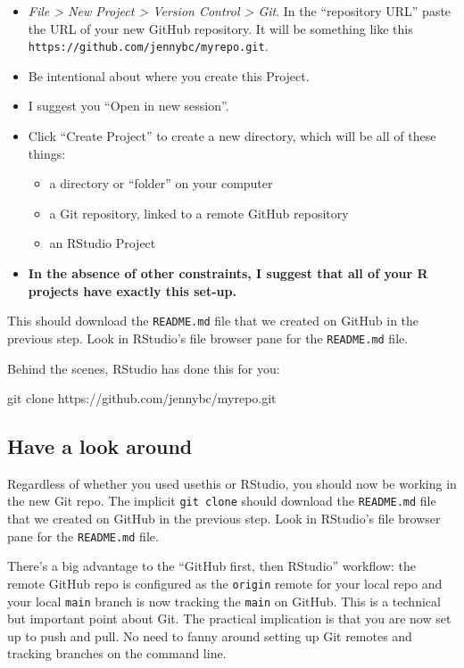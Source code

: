\documentclass[
]{book}
\newenvironment{Shaded}{\begin{snugshade}}{\end{snugshade}}
\newcommand{\NormalTok}[1]{#1}
\providecommand{\tightlist}{%
  \setlength{\itemsep}{0pt}\setlength{\parskip}{0pt}}
\begin{document}
\begin{itemize}
\tightlist
\item
  \emph{File \textgreater{} New Project \textgreater{} Version Control \textgreater{} Git}. In the ``repository URL'' paste
  the URL of your new GitHub repository. It will be something like this
  \texttt{https://github.com/jennybc/myrepo.git}.
\item
  Be intentional about where you create this Project.
\item
  I suggest you ``Open in new session''.
\item
  Click ``Create Project'' to create a new directory, which will be all of these things:

  \begin{itemize}
  \tightlist
  \item
    a directory or ``folder'' on your computer
  \item
    a Git repository, linked to a remote GitHub repository
  \item
    an RStudio Project
  \end{itemize}
\item
  \textbf{In the absence of other constraints, I suggest that all of your R projects have exactly this set-up.}
\end{itemize}

This should download the \texttt{README.md} file that we created on GitHub in the previous step.
Look in RStudio's file browser pane for the \texttt{README.md} file.

Behind the scenes, RStudio has done this for you:

\begin{Shaded}
\begin{Highlighting}[]
\NormalTok{git clone https://github.com/jennybc/myrepo.git}
\end{Highlighting}
\end{Shaded}

\subsection{Have a look around}\label{have-a-look-around}

Regardless of whether you used usethis or RStudio, you should now be working in the new Git repo.
The implicit \texttt{git\ clone} should download the \texttt{README.md} file that we created on GitHub in the previous step.
Look in RStudio's file browser pane for the \texttt{README.md} file.

There's a big advantage to the ``GitHub first, then RStudio'' workflow: the remote GitHub repo is configured as the \texttt{origin} remote for your local repo and your local \texttt{main} branch is now tracking the \texttt{main} on GitHub.
This is a technical but important point about Git.
The practical implication is that you are now set up to push and pull.
No need to fanny around setting up Git remotes and tracking branches on the command line.
\end{document}
